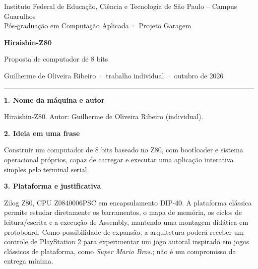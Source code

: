 \documentclass[10pt,a4paper]{article}
\newcommand{\field}[2]{\par\vspace{4pt}\noindent\textbf{#1. #2}\par\nopagebreak[4]}
\begin{document}
\fontsize{9}{10}\selectfont
\begin{center}
{\small Instituto Federal de Educação, Ciência e Tecnologia de São Paulo -- Campus Guarulhos\\
Pós-graduação em Computação Aplicada · Projeto Garagem}
\par\vspace{4pt}
{\LARGE\bfseries\color{ifspblue} Hiraishin-Z80}\par
{\large Proposta de computador de 8 bits}\par
Guilherme de Oliveira Ribeiro · trabalho individual · outubro de 2026
\end{center}
\vspace{8pt}\hrule\vspace{9pt}

\field{1}{Nome da máquina e autor} Hiraishin-Z80. Autor: Guilherme de Oliveira Ribeiro (individual).

\field{2}{Ideia em uma frase} Construir um computador de 8 bits baseado no Z80, com bootloader e sistema operacional próprios, capaz de carregar e executar uma aplicação interativa simples pelo terminal serial.

\field{3}{Plataforma e justificativa} Zilog Z80, CPU Z0840006PSC em encapsulamento DIP-40. A plataforma clássica permite estudar diretamente os barramentos, o mapa de memória, os ciclos de leitura/escrita e a execução de Assembly, mantendo uma montagem didática em protoboard. Como possibilidade de expansão, a arquitetura poderá receber um controle de PlayStation 2 para experimentar um jogo autoral inspirado em jogos clássicos de plataforma, como \textit{Super Mario Bros.}; não é um compromisso da entrega mínima.
\end{document}
